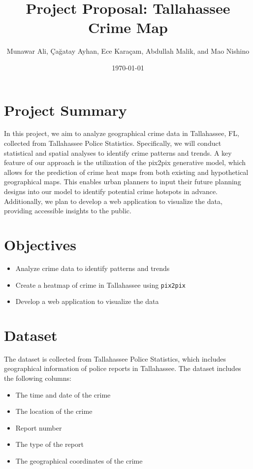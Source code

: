 \documentclass[10pt]{article}
\title{Project Proposal: Tallahassee Crime Map}
\author{Munawar Ali, Çağatay Ayhan, Ece Karaçam, Abdullah Malik, and Mao Nishino}
\date{\today}
\begin{document}
\maketitle

\section{Project Summary}
In this project, we aim to analyze geographical crime data in Tallahassee, FL, collected from Tallahassee Police Statistics. Specifically, we will conduct statistical and spatial analyses to identify crime patterns and trends. A key feature of our approach is the utilization of the pix2pix generative model, which allows for the prediction of crime heat maps from both existing and hypothetical geographical maps. This enables urban planners to input their future planning designs into our model to identify potential crime hotspots in advance. Additionally, we plan to develop a web application to visualize the data, providing accessible insights to the public.
\section{Objectives}
\begin{itemize}
    \item Analyze crime data to identify patterns and trends
    \item Create a heatmap of crime in Tallahassee using \verb|pix2pix|
    \item Develop a web application to visualize the data
\end{itemize}

\section{Dataset}
The dataset is collected from Tallahassee Police Statistics, which includes geographical information of police reports in Tallahassee. The dataset includes the following columns:
\begin{itemize}
    \item The time and date of the crime
    \item The location of the crime
    \item Report number
    \item The type of the report
    \item The geographical coordinates of the crime
\end{itemize}
\end{document}
